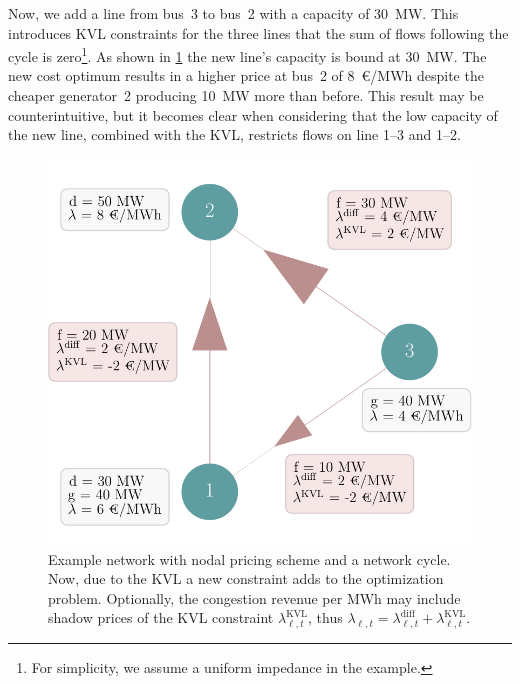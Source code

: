 \documentclass[11pt,twocolumn]{article}
\newcommand{\lmp}[1][n]{\lambda_{#1,t}}
\newcommand{\lmpdiff}[1][\ell]{\lmp[#1]^\text{diff}}
\newcommand{\lmpkvl}[1][\ell]{\lmp[#1]^\text{KVL}}
\begin{document}
Now, we add a line from bus~3 to bus~2 with a capacity of 30~MW. This introduces \ac{KVL} constraints for the three lines that the sum of flows following the cycle is zero\footnote{For simplicity, we assume a uniform impedance in the example.}. As shown in \cref{fig:example-network} the new line's capacity is bound at 30~MW. The new cost optimum results in a higher price at bus~2 of 8~\euro/MWh despite the cheaper generator~2 producing 10~MW more than before. This result may be counterintuitive, but it becomes clear when considering that the low capacity of the new line, combined with the \ac{KVL}, restricts flows on line 1--3 and 1--2.

\begin{figure}[h!]
    \includegraphics[width=\linewidth]{example-with-cycles/network}
    \caption{Example network with nodal pricing scheme and a network cycle. Now, due to the \ac{KVL} a new constraint adds to the optimization problem. Optionally, the congestion revenue per MWh may include shadow prices of the \ac{KVL} constraint $\lmpkvl$, thus $\lmp[\ell] = \lmpdiff + \lmpkvl$.}
    \label{fig:example-network}
\end{figure}
\end{document}

